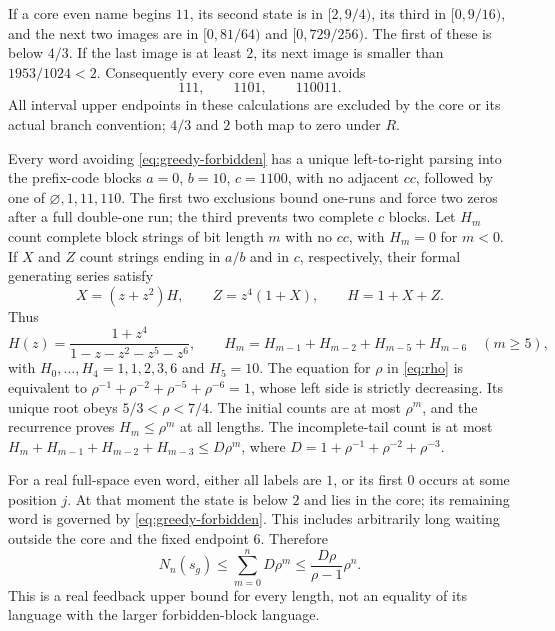 \documentclass[11pt,reqno]{amsart}
\numberwithin{equation}{section}
\theoremstyle{definition}
\begin{document}
If a core even name begins $11$, its second state is in
$[2,9/4)$, its third in $[0,9/16)$, and the next two images
are in $[0,81/64)$ and $[0,729/256)$. The first of these
is below $4/3$. If the last image is at least $2$, its next
image is smaller than $1953/1024<2$.
Consequently every core even name avoids
\begin{equation}\label{eq:greedy-forbidden}
 111,\qquad1101,\qquad110011.
\end{equation}
All interval upper endpoints in these calculations are excluded by
the core or its actual branch convention; $4/3$ and $2$ both
map to zero under $R$.

Every word avoiding \eqref{eq:greedy-forbidden} has a unique
left-to-right parsing into the prefix-code blocks
$a=0$, $b=10$, $c=1100$, with no adjacent $cc$, followed by
one of $\varnothing,1,11,110$. The first two exclusions bound
one-runs and force two zeros after a full double-one run; the third
prevents two complete $c$ blocks. Let $H_m$ count complete block
strings of bit length $m$ with no $cc$, with $H_m=0$ for
$m<0$. If $X$ and $Z$ count strings ending in $a/b$ and in
$c$, respectively, their formal generating series satisfy
\[
 X=(z+z^2)H,\qquad Z=z^4(1+X),\qquad H=1+X+Z.
\]
Thus
\begin{equation}\label{eq:greedy-H}
 H(z)=\frac{1+z^4}{1-z-z^2-z^5-z^6},\qquad
 H_m=H_{m-1}+H_{m-2}+H_{m-5}+H_{m-6}\quad(m\ge5),
\end{equation}
with $H_0,\ldots,H_4=1,1,2,3,6$ and $H_5=10$.
The equation for $\rho$ in \eqref{eq:rho} is equivalent to
$\rho^{-1}+\rho^{-2}+\rho^{-5}+\rho^{-6}=1$, whose left side
is strictly decreasing. Its unique root obeys $5/3<\rho<7/4$.
The initial counts are at most $\rho^m$, and the recurrence
proves $H_m\le\rho^m$ at all lengths. The incomplete-tail
count is at most
$H_m+H_{m-1}+H_{m-2}+H_{m-3}\le D\rho^m$, where
$D=1+\rho^{-1}+\rho^{-2}+\rho^{-3}$.

For a real full-space even word, either all labels are $1$, or its
first $0$ occurs at some position $j$. At that moment the state
is below $2$ and lies in the core; its remaining word is governed
by \eqref{eq:greedy-forbidden}. This includes arbitrarily long
waiting outside the core and the fixed endpoint $6$.
Therefore
\begin{equation}\label{eq:greedy-upper}
 N_n(s_g)\le\sum_{m=0}^n D\rho^m
 \le\frac{D\rho}{\rho-1}\rho^n.
\end{equation}
This is a real feedback upper bound for every length, not an equality
of its language with the larger forbidden-block language.
\end{document}
